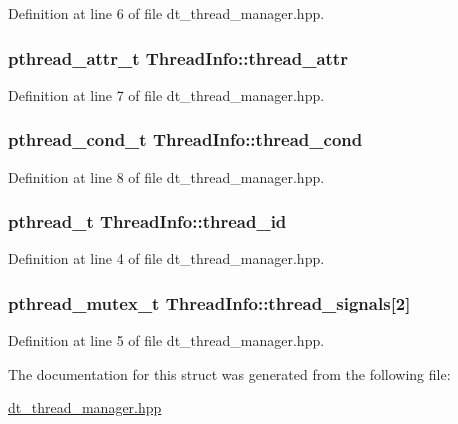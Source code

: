 Definition at line 6 of file dt\_\-thread\_\-manager.hpp.\hypertarget{struct_thread_info_ab37b607645487d10df4fab2dd4671aa6}{
\subsubsection[{thread\_\-attr}]{\setlength{\rightskip}{0pt plus 5cm}pthread\_\-attr\_\-t {\bf ThreadInfo::thread\_\-attr}}}
\label{struct_thread_info_ab37b607645487d10df4fab2dd4671aa6}


Definition at line 7 of file dt\_\-thread\_\-manager.hpp.\hypertarget{struct_thread_info_a51306079f645f2947a05008b49637382}{
\subsubsection[{thread\_\-cond}]{\setlength{\rightskip}{0pt plus 5cm}pthread\_\-cond\_\-t {\bf ThreadInfo::thread\_\-cond}}}
\label{struct_thread_info_a51306079f645f2947a05008b49637382}


Definition at line 8 of file dt\_\-thread\_\-manager.hpp.\hypertarget{struct_thread_info_aec69ec1d73a2c22520ead441b0f90f25}{
\subsubsection[{thread\_\-id}]{\setlength{\rightskip}{0pt plus 5cm}pthread\_\-t {\bf ThreadInfo::thread\_\-id}}}
\label{struct_thread_info_aec69ec1d73a2c22520ead441b0f90f25}


Definition at line 4 of file dt\_\-thread\_\-manager.hpp.\hypertarget{struct_thread_info_aef3356f4a3ec181af92e1b1703ffc9f7}{
\subsubsection[{thread\_\-signals}]{\setlength{\rightskip}{0pt plus 5cm}pthread\_\-mutex\_\-t {\bf ThreadInfo::thread\_\-signals}\mbox{[}2\mbox{]}}}
\label{struct_thread_info_aef3356f4a3ec181af92e1b1703ffc9f7}


Definition at line 5 of file dt\_\-thread\_\-manager.hpp.

The documentation for this struct was generated from the following file:\begin{DoxyCompactItemize}
\item 
\hyperlink{dt__thread__manager_8hpp}{dt\_\-thread\_\-manager.hpp}\end{DoxyCompactItemize}
